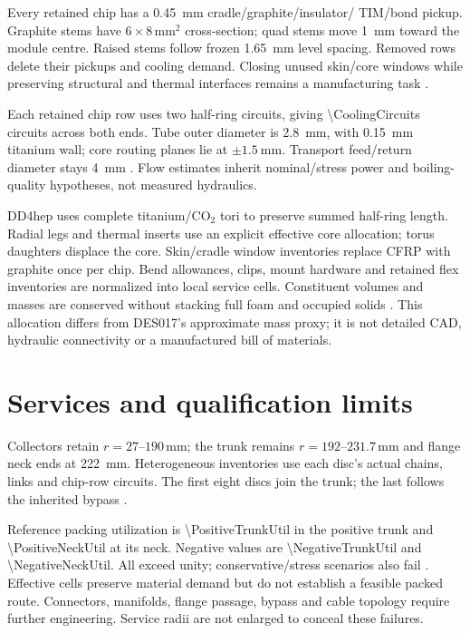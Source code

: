 Every retained chip has a \qty{0.45}{\milli\metre} cradle/graphite/insulator/
TIM/bond pickup. Graphite stems have $6\times8\,\unit{\milli\metre^2}$
cross-section; quad stems move \qty{1}{\milli\metre} toward the module centre.
Raised stems follow frozen \qty{1.65}{\milli\metre} level spacing. Removed
rows delete their pickups and cooling demand. Closing unused skin/core windows
while preserving structural and thermal interfaces remains a manufacturing task
\cite{mixed,trim,model}.

Each retained chip row uses two half-ring circuits, giving
\num{\CoolingCircuits} circuits across both ends. Tube outer diameter is
\qty{2.8}{\milli\metre}, with \qty{0.15}{\milli\metre} titanium wall;
core routing planes lie at $\pm\qty{1.5}{\milli\metre}$. Transport feed/return
diameter stays \qty{4}{\milli\metre} \cite{mixed,model}. Flow estimates inherit
nominal/stress power and boiling-quality hypotheses, not measured hydraulics.

DD4hep uses complete titanium/CO$_2$ tori to preserve summed half-ring length.
Radial legs and thermal inserts use an explicit effective core allocation;
torus daughters displace the core. Skin/cradle window inventories replace CFRP
with graphite once per chip. Bend allowances, clips, mount hardware and retained
flex inventories are normalized into local service cells. Constituent volumes
and masses are conserved without stacking full foam and occupied solids
\cite{model}. This allocation differs from DES017's approximate mass proxy;
it is not detailed CAD, hydraulic connectivity or a manufactured bill of materials.

\section{Services and qualification limits}
Collectors retain $r=27$--$190\,\unit{\milli\metre}$; the trunk remains
$r=192$--$231.7\,\unit{\milli\metre}$ and flange neck ends at
\qty{222}{\milli\metre}. Heterogeneous inventories use each disc's actual
chains, links and chip-row circuits. The first eight discs join the trunk;
the last follows the inherited bypass \cite{trim,model}.

Reference packing utilization is \num{\PositiveTrunkUtil} in the positive
trunk and \num{\PositiveNeckUtil} at its neck. Negative values are
\num{\NegativeTrunkUtil} and \num{\NegativeNeckUtil}. All exceed unity;
conservative/stress scenarios also fail \cite{trim,model}. Effective cells
preserve material demand but do not establish a feasible packed route.
Connectors, manifolds, flange passage, bypass and cable topology require further
engineering. Service radii are not enlarged to conceal these failures.

